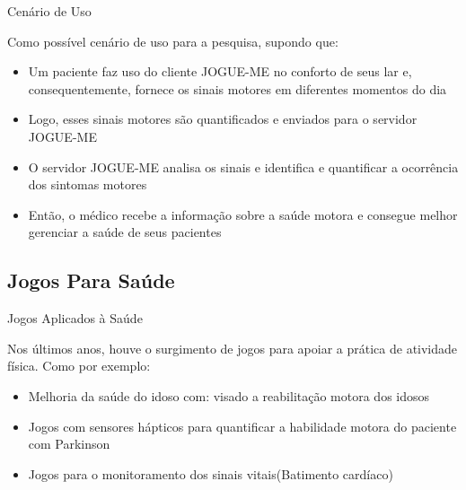 \documentclass{beamer}
\begin{document}
\begin{frame}{Cenário de Uso}
   \begin{block}{}
      Como possível cenário de uso para a pesquisa, supondo que:
      \begin{itemize}
       \item Um paciente faz uso do cliente JOGUE-ME no conforto de seus lar e, consequentemente, fornece os sinais motores em diferentes momentos do dia
       \item Logo, esses sinais motores são quantificados e enviados para o servidor JOGUE-ME
       \item O servidor JOGUE-ME analisa os sinais e identifica e quantificar a ocorrência dos sintomas motores
       \item Então, o médico recebe a informação sobre a saúde motora e consegue melhor gerenciar a saúde de seus pacientes 
      \end{itemize}
  \end{block}
\end{frame}

\subsection{Jogos Para Saúde}
\begin{frame}{Jogos Aplicados à Saúde}
	\begin{block}{}	
	Nos últimos anos, houve o surgimento de jogos para apoiar a prática de atividade física. Como por exemplo:
	
	\begin{itemize}
	    \item Melhoria da saúde do idoso com: visado a reabilitação motora dos idosos~\cite{sacbespoke2014}
	    \item Jogos com sensores hápticos para quantificar a habilidade motora do paciente com Parkinson ~\cite{atkinson2010}
	    \item Jogos para o monitoramento dos sinais vitais(Batimento cardíaco)~\cite{Sinclair:2009:UVB:1515604.1515617}
	\end{itemize}
	\end{block}
\end{frame}
\end{document}
